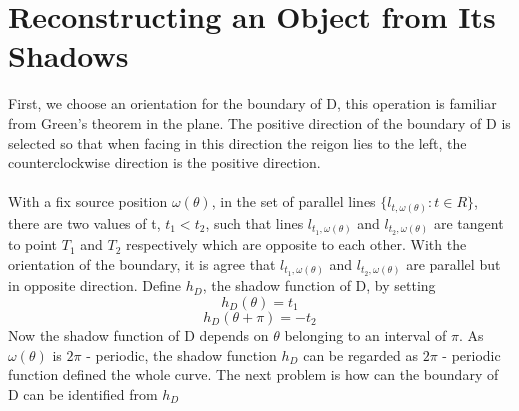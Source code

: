 \documentclass[a4paper]{article}
\begin{document}
\section{Reconstructing an Object from Its Shadows}
First, we choose an orientation for the boundary of D, this operation is familiar from Green's theorem in the plane. The positive direction of the boundary of D is selected so that when facing in this direction the reigon lies to the left, the counterclockwise direction is the positive direction.\\ \\
With a fix source position $\omega(\theta)$, in the set of parallel lines $\{l_{t,\omega(\theta)}:t\in R \}$, there are two values of t, $t_1 < t_2$, such that lines $l_{t_1,\omega(\theta)}$ and $l_{t_2,\omega(\theta)}$ are tangent to point $T_1$ and $T_2$ respectively which are opposite to each other. With the orientation of the boundary, it is agree that $l_{t_1,\omega(\theta)}$ and $l_{t_2,\omega(\theta)}$ are parallel but in opposite direction. Define $h_D$, the shadow function of D, by setting
\begin{equation*}
    h_D(\theta) = t_1
\end{equation*}
\begin{equation*}
    h_D(\theta + \pi) = -t_2
\end{equation*}
Now the shadow function of D depends on $\theta$ belonging to an interval of $\pi$. As $\omega(\theta)$ is $2\pi$ - periodic, the shadow function $h_D$ can be regarded as $2\pi$ - periodic function defined the whole curve. The next problem is how can the boundary of D can be identified from $h_D$\\
\end{document}
